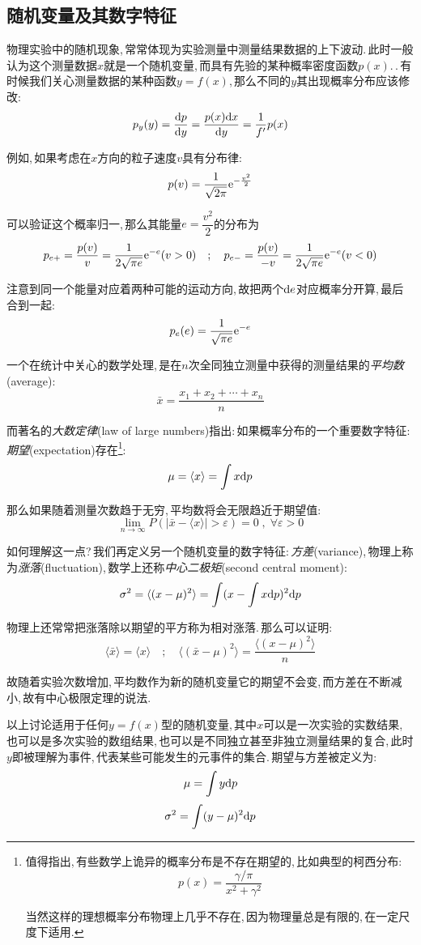 \subsection{随机变量及其数字特征}
物理实验中的随机现象,\,常常体现为实验测量中测量结果数据的上下波动.\,此时一般认为这个测量数据\(x\)就是一个随机变量,\,而具有先验的某种概率密度函数\(p(x)\).\,.\,有时候我们关心测量数据的某种函数\(y=f(x)\),\,那么不同的\(y\)其出现概率分布应该修改:
\[p_y(y)=\frac{\textrm{d} p}{\textrm{d} y}=\frac{p(x)\textrm{d} x}{\textrm{d} y}=\frac{1}{f'}p(x)\]

例如,\,如果考虑在\(x\)方向的粒子速度\(v\)具有分布律:
\[p(v)=\frac{1}{\sqrt{2\pi}}{\rm e}^{-\frac{v^2}{2}}\]

可以验证这个概率归一,\,那么其能量\(e=\dfrac{v^2}{2}\)的分布为
\[p_{e+}=\frac{p(v)}{v}=\frac{1}{2\sqrt{\pi e}}{\rm e}^{-e}(v>0)\quad ;\quad p_{e-}=\frac{p(v)}{-v}=\frac{1}{2\sqrt{\pi e}}{\rm e}^{-e}(v<0)\]

注意到同一个能量对应着两种可能的运动方向,\,故把两个\(\textrm{d} e\)对应概率分开算,\,最后合到一起:
\[p_e(e)=\frac{1}{\sqrt{\pi e}}{\rm e}^{-e}\]

一个在统计中关心的数学处理,\,是在\(n\)次全同独立测量中获得的测量结果的\emph{平均数}(average):
\[\bar{x}=\frac{x_1+x_2+\cdots+x_n}{n}\]

而著名的\emph{大数定律}(law of large numbers)指出:\,如果概率分布的一个重要数字特征:\,\emph{期望}(expectation)存在\footnote{值得指出,\,有些数学上诡异的概率分布是不存在期望的,\,比如典型的柯西分布:
\[p(x)=\frac{\gamma/\pi}{x^2+\gamma^2}\]

当然这样的理想概率分布物理上几乎不存在,\,因为物理量总是有限的,\,在一定尺度下适用.}:
\[\mu=\langle x\rangle=\int x\textrm{d} p\]

那么如果随着测量次数趋于无穷,\,平均数将会无限趋近于期望值:
\[\lim_{n\to \infty}P(|\bar{x}-\langle x\rangle|>\varepsilon)=0\; , \; \forall \varepsilon>0\]

如何理解这一点?\,我们再定义另一个随机变量的数字特征:\,\emph{方差}(variance),\,物理上称为\emph{涨落}(fluctuation),\,数学上还称\emph{中心二极矩}(second central moment):
\[\sigma^2=\langle(x-\mu)^2\rangle=\int(x-\int x\textrm{d} p)^2\textrm{d} p\]

物理上还常常把涨落除以期望的平方称为相对涨落.\,那么可以证明:
\[\langle\bar{x}\rangle=\langle x\rangle\quad ;\quad \langle(\bar{x}-\mu)^2\rangle=\frac{\langle(x-\mu)^2\rangle}{n}\]

故随着实验次数增加,\,平均数作为新的随机变量它的期望不会变,\,而方差在不断减小,\,故有中心极限定理的说法.

以上讨论适用于任何\(y=f(x)\)型的随机变量,\,其中\(x\)可以是一次实验的实数结果,\,也可以是多次实验的数组结果,\,也可以是不同独立甚至非独立测量结果的复合,\,此时\(y\)即被理解为事件,\,代表某些可能发生的元事件的集合.\,期望与方差被定义为:
\[\mu=\int y\textrm{d} p\]
\[\sigma^2=\int (y-\mu)^2\textrm{d} p\]

